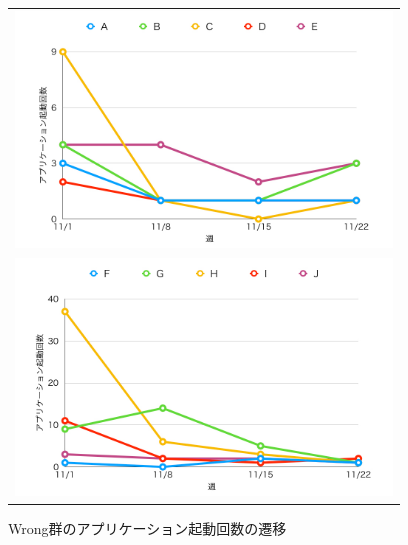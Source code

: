 \begin{figure}[htb]
\begin{center}
\begin{tabular}{c}

  \begin{minipage}[htb]{\linewidth}
  \begin{center}
  \includegraphics[width=10cm]{images/7/same_app_open.png}
  \caption{Same群のアプリケーション起動回数の遷移}
  \label{fig:same_app_open}
  \end{center}
  \end{minipage}

  \\

  \begin{minipage}[htb]{\linewidth}
  \begin{center}
  \includegraphics[width=10cm]{images/7/wrong_app_open.png}
  \caption{Wrong群のアプリケーション起動回数の遷移}
  \label{fig:wrong_app_open}
  \end{center}
  \end{minipage}

  \\


\end{tabular}
\end{center}
\end{figure}
